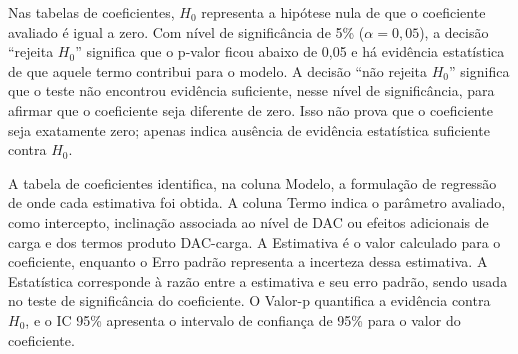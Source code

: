 \documentclass[
  brazilian,
]{article}
\renewcommand{\_}{\oldunderscore\discretionary{}{}{}}
\begin{document}
Nas tabelas de coeficientes, \(H_0\) representa a hipótese nula de que o
coeficiente avaliado é igual a zero. Com nível de significância de 5\%
(\(\alpha = 0{,}05\)), a decisão ``rejeita \(H_0\)'' significa que o
p-valor ficou abaixo de 0,05 e há evidência estatística de que aquele
termo contribui para o modelo. A decisão ``não rejeita \(H_0\)''
significa que o teste não encontrou evidência suficiente, nesse nível de
significância, para afirmar que o coeficiente seja diferente de zero.
Isso não prova que o coeficiente seja exatamente zero; apenas indica
ausência de evidência estatística suficiente contra \(H_0\).

A tabela de coeficientes identifica, na coluna Modelo, a formulação de
regressão de onde cada estimativa foi obtida. A coluna Termo indica o
parâmetro avaliado, como intercepto, inclinação associada ao nível de DAC
ou efeitos adicionais de carga e dos termos produto DAC-carga. A Estimativa é o valor
calculado para o coeficiente, enquanto o Erro padrão representa a
incerteza dessa estimativa. A Estatística corresponde à razão entre a
estimativa e seu erro padrão, sendo usada no teste de significância do
coeficiente. O Valor-p quantifica a evidência contra \(H_0\), e o IC
95\% apresenta o intervalo de confiança de 95\% para o valor do
coeficiente.
\end{document}
